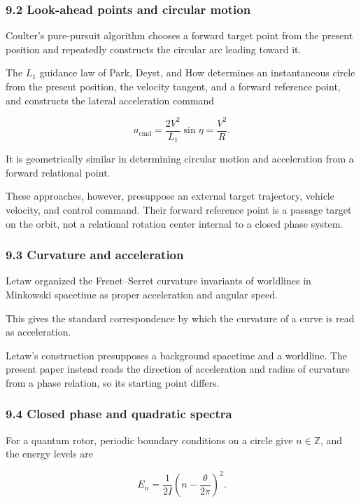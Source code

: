 \documentclass[
  10pt,
  a4paper,
]{article}
\begin{document}
\subsubsection{9.2 Look-ahead points and circular
motion}\label{look-ahead-points-and-circular-motion}

Coulter's pure-pursuit algorithm chooses a forward target point from the
present position and repeatedly constructs the circular arc leading
toward it.

The \(L_1\) guidance law of Park, Deyst, and How determines an
instantaneous circle from the present position, the velocity tangent,
and a forward reference point, and constructs the lateral acceleration
command

\[
a_{\mathrm{cmd}}
=\frac{2V^2}{L_1}\sin\eta
=\frac{V^2}{R}.
\]

It is geometrically similar in determining circular motion and
acceleration from a forward relational point.

These approaches, however, presuppose an external target trajectory,
vehicle velocity, and control command. Their forward reference point is
a passage target on the orbit, not a relational rotation center internal
to a closed phase system.

\subsubsection{9.3 Curvature and
acceleration}\label{curvature-and-acceleration}

Letaw organized the Frenet--Serret curvature invariants of worldlines in
Minkowski spacetime as proper acceleration and angular speed.

This gives the standard correspondence by which the curvature of a curve
is read as acceleration.

Letaw's construction presupposes a background spacetime and a worldline.
The present paper instead reads the direction of acceleration and radius
of curvature from a phase relation, so its starting point differs.

\subsubsection{9.4 Closed phase and quadratic
spectra}\label{closed-phase-and-quadratic-spectra}

For a quantum rotor, periodic boundary conditions on a circle give
\(n\in\mathbb Z\), and the energy levels are

\[
E_n
=\frac{1}{2I}
\left(
n-\frac{\theta}{2\pi}
\right)^2.
\]
\end{document}
